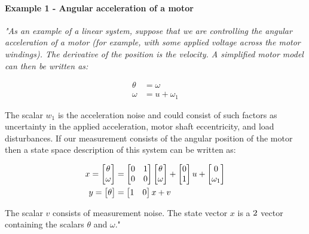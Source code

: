 \paragraph{Example 1 - Angular acceleration of a motor}
{\em
"As an example of a linear system, suppose that we are controlling the angular acceleration of a motor (for example, with some applied voltage across the motor windings). The derivative of the position is the velocity. A simplified motor model can then be written as:

\begin{subequations}
\begin{align*}
    \theta &= \omega \\
    \omega &= u + \omega_1
\end{align*}
\end{subequations}

The scalar \(w_1\) is the acceleration noise and could consist of such factors as uncertainty in the applied acceleration, motor shaft eccentricity, and load disturbances. If our measurement consists of the angular position of the motor then a state space description of this system can be written as:

\begin{subequations}
\begin{align*}
    x =
    \begin{bmatrix}
        \theta \\
        \omega
    \end{bmatrix}
    &=
    \begin{bmatrix}
        0 & 1 \\
        0 & 0
    \end{bmatrix}
    \begin{bmatrix}
        \theta \\
        \omega
    \end{bmatrix}
    +
    \begin{bmatrix}
        0 \\
        1
    \end{bmatrix}
    u + 
    \begin{bmatrix}
        0 \\
        \omega_1
    \end{bmatrix}
    \notag \\
    y = 
    \begin{bmatrix}
        \theta
    \end{bmatrix}
    &=
    \begin{bmatrix}
        1 & 0 \\
    \end{bmatrix}
    x + v
\end{align*}
\end{subequations}

The scalar \(v\) consists of measurement noise. The state vector \(x\) is a \(2 \time 1\) vector containing the scalars \(\theta\) and \(\omega\)."
} \cite[page~20]{simon_optimal_2006}

